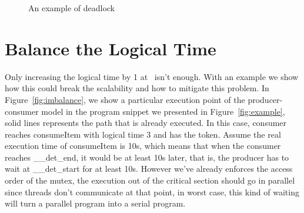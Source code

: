 \begin{figure}
\centering
{}
\caption{An example of deadlock}
\label{fig:deadlock}
\end{figure}

\newpage
\section{Balance the Logical Time} \label{sec:logimbalance}
Only increasing the logical time by 1 at \detend\ isn't enough. With an example we show how this could break the scalability and how to mitigate this problem. In Figure~\ref{fig:imbalance}, we show a particular execution point of the producer-consumer model in the program snippet we presented in Figure~\ref{fig:example}, solid lines represents the path that is already executed. In this case, consumer reaches consumeItem with logical time 3 and has the token. Assume the real execution time of consumeItem is 10s, which means that when the consumer reaches \_\_det\_end, it would be at least 10s later, that is, the producer has to wait at \_\_det\_start for at least 10s. However we've already enforces the access order of the mutex, the execution out of the critical section should go in parallel since threads don't communicate at that point, in worst case, this kind of waiting will turn a parallel program into a serial program.

